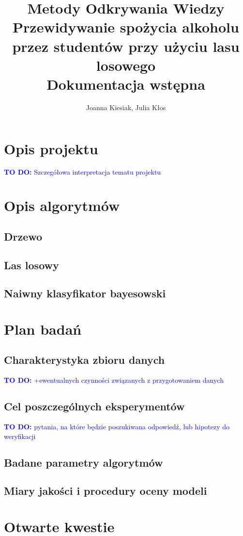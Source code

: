 \documentclass{article}
\title{{\normalfont Metody Odkrywania Wiedzy}\vspace{0.2cm} \\ 
Przewidywanie spożycia alkoholu przez studentów przy użyciu lasu losowego\\
\vspace{0.2cm}
\large{\normalfont Dokumentacja wstępna}}
\author{
Joanna Kiesiak, Julia Kłos\\

}
\newcommand{\todo}[1]{\textcolor{blue}{\textbf{TO DO:} #1}}
\begin{document}
\maketitle

\section{Opis projektu}
 \todo{Szczegółowa interpretacja tematu projektu}
\section{Opis algorytmów}
\subsection{Drzewo}
\subsection{Las losowy}
\subsection{Naiwny klasyfikator bayesowski}

\section{Plan badań}
\subsection{Charakterystyka zbioru danych}
\todo{+ewentualnych czynności związanych z przygotowaniem danych}
\subsection{Cel poszczególnych eksperymentów}
\todo{pytania, na które będzie poszukiwana odpowiedź, lub hipotezy do weryfikacji}
\subsection{Badane parametry algorytmów}
\subsection{Miary jakości i procedury oceny modeli}
\section{Otwarte kwestie}


\end{document}
